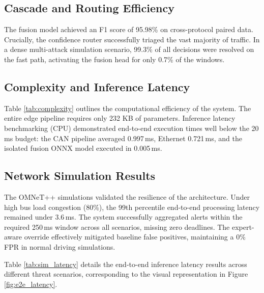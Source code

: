 \documentclass[conference]{IEEEtran}
\begin{document}
\subsection{Cascade and Routing Efficiency}
The fusion model achieved an F1 score of 95.98\% on cross-protocol paired data. Crucially, the confidence router successfully triaged the vast majority of traffic. In a dense multi-attack simulation scenario, 99.3\% of all decisions were resolved on the fast path, activating the fusion head for only 0.7\% of the windows.

\subsection{Complexity and Inference Latency}
Table \ref{tab:complexity} outlines the computational efficiency of the system. The entire edge pipeline requires only 232 KB of parameters. 
Inference latency benchmarking (CPU) demonstrated end-to-end execution times well below the 20\,ms budget: the CAN pipeline averaged 0.997\,ms, Ethernet 0.721\,ms, and the isolated fusion ONNX model executed in 0.005\,ms.

\begin{table}[H]
\centering
\caption{Model Complexity and Parameters}
\label{tab:complexity}

\end{table}

\subsection{Network Simulation Results}
The OMNeT++ simulations validated the resilience of the architecture. Under high bus load congestion (80\%), the 99th percentile end-to-end processing latency remained under 3.6\,ms. The system successfully aggregated alerts within the required 250\,ms window across all scenarios, missing zero deadlines. The expert-aware override effectively mitigated baseline false positives, maintaining a 0\% FPR in normal driving simulations.

Table \ref{tab:sim_latency} details the end-to-end inference latency results across different threat scenarios, corresponding to the visual representation in Figure \ref{fig:e2e_latency}.

\begin{table}[H]
\centering
\caption{Simulation Inference Latency (Mean $\pm$ Max, ms)}
\label{tab:sim_latency}
\resizebox{\columnwidth}{!}{%

}
\end{table}
\end{document}
